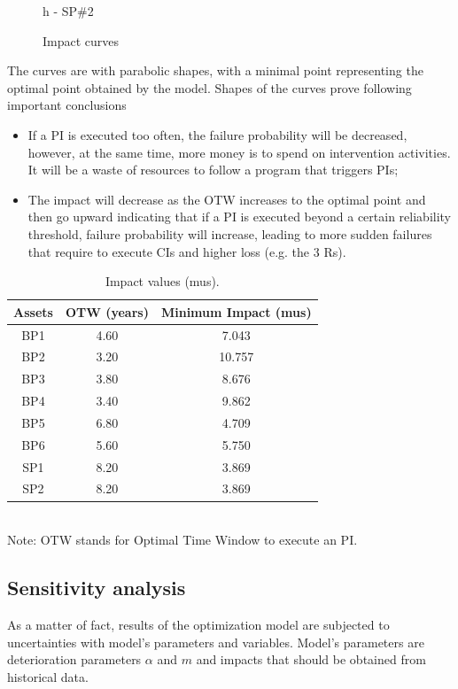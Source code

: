 \begin{figure}[!htb]
\begin{minipage}[b]{0.5\linewidth}
	\caption*{h - SP\#2}
\end{minipage}
\caption{Impact curves}
\label{ch05_fig_ois}
\end{figure}

The curves are with parabolic shapes, with a minimal point representing the optimal point obtained by the model. Shapes of the curves prove following important conclusions

\begin{itemize}
\item If a PI is executed too often, the failure probability will be decreased, however, at the same time, more money is to spend on intervention activities. It will be a waste of resources to follow a program that triggers PIs;
\item The impact will decrease as the OTW increases to the optimal point and then go upward indicating that if a PI is executed beyond a certain reliability threshold, failure probability will increase, leading to more sudden failures that require to execute CIs and higher loss (e.g. the 3 Rs).
\end{itemize}


\begin{table}[h]
	\caption{Impact values (mus).}
	\label{ch05_tbl_impactvalue01}
	{\footnotesize
\begin{tabular}{c|c|c}
	\hline
	Assets & OTW (years) & Minimum Impact (mus) \\ 
	\hline
	BP1 & 4.60 & 7.043 \\ 
	BP2 & 3.20 & 10.757 \\ 
	BP3 & 3.80 & 8.676 \\ 
	BP4 & 3.40 & 9.862 \\ 
	BP5 & 6.80 & 4.709 \\ 
	BP6 & 5.60 & 5.750 \\ 
	SP1 & 8.20 & 3.869 \\ 
	SP2 & 8.20 & 3.869 \\ 
	\hline
\end{tabular}\\
		Note: OTW stands for Optimal Time Window to execute an PI.
	}
\end{table}

\subsection{Sensitivity analysis}
As a matter of fact, results of the optimization model are subjected to uncertainties with model's parameters and variables. Model's parameters are deterioration parameters $\alpha$ and $m$ and impacts that should be obtained from historical data. 


